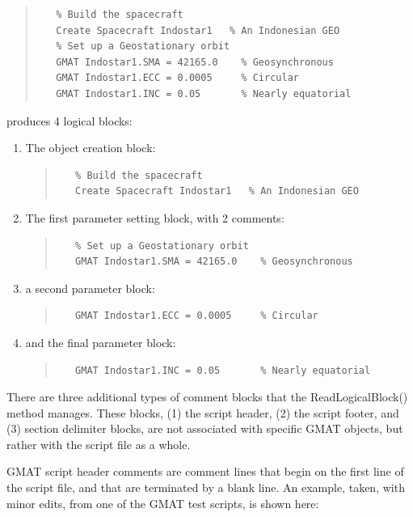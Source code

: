 \begin{quote}
\begin{verbatim}
   % Build the spacecraft
   Create Spacecraft Indostar1   % An Indonesian GEO
   % Set up a Geostationary orbit
   GMAT Indostar1.SMA = 42165.0    % Geosynchronous
   GMAT Indostar1.ECC = 0.0005     % Circular
   GMAT Indostar1.INC = 0.05       % Nearly equatorial
\end{verbatim}
\end{quote}
\noindent produces 4 logical blocks:

\begin{enumerate}
\item The object creation block:
\begin{quote}
\begin{verbatim}
   % Build the spacecraft
   Create Spacecraft Indostar1   % An Indonesian GEO
\end{verbatim}
\end{quote}
\item The first parameter setting block, with 2 comments:
\begin{quote}
\begin{verbatim}
   % Set up a Geostationary orbit
   GMAT Indostar1.SMA = 42165.0    % Geosynchronous
\end{verbatim}
\end{quote}
\item a second parameter block:
\begin{quote}
\begin{verbatim}
   GMAT Indostar1.ECC = 0.0005     % Circular
\end{verbatim}
\end{quote}
\item and the final parameter block:
\begin{quote}
\begin{verbatim}
   GMAT Indostar1.INC = 0.05       % Nearly equatorial
\end{verbatim}
\end{quote}
\end{enumerate}

There are three additional types of comment blocks that the ReadLogicalBlock() method manages.
These blocks, (1) the script header, (2) the script footer, and (3) section delimiter blocks, are
not associated with specific GMAT objects, but rather with the script file as a whole.

GMAT script header comments are comment lines that begin on the first line of the script file, and
that are terminated by a blank line.  An example, taken, with minor edits, from one of the GMAT test
scripts, is shown here:

